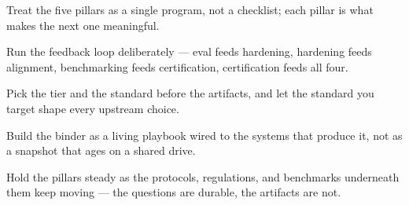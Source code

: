 \begin{TNkeytakeaways}
\item Treat the five pillars as a single program, not a checklist; each pillar is what makes the next one meaningful.
\item Run the feedback loop deliberately --- eval feeds hardening, hardening feeds alignment, benchmarking feeds certification, certification feeds all four.
\item Pick the tier and the standard before the artifacts, and let the standard you target shape every upstream choice.
\item Build the binder as a living playbook wired to the systems that produce it, not as a snapshot that ages on a shared drive.
\item Hold the pillars steady as the protocols, regulations, and benchmarks underneath them keep moving --- the questions are durable, the artifacts are not.
\end{TNkeytakeaways}



